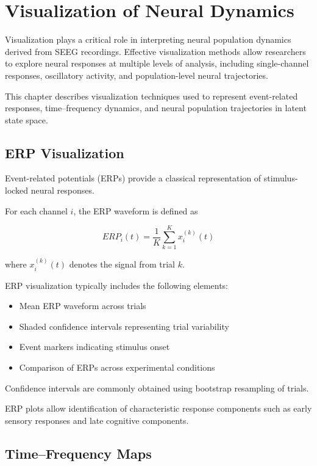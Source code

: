 \documentclass[11pt]{report}
\begin{document}
\chapter{Visualization of Neural Dynamics}

Visualization plays a critical role in interpreting neural population
dynamics derived from SEEG recordings. Effective visualization methods
allow researchers to explore neural responses at multiple levels of
analysis, including single-channel responses, oscillatory activity,
and population-level neural trajectories.

This chapter describes visualization techniques used to represent
event-related responses, time--frequency dynamics, and neural
population trajectories in latent state space.

\section{ERP Visualization}

Event-related potentials (ERPs) provide a classical representation of
stimulus-locked neural responses.

For each channel $i$, the ERP waveform is defined as

\begin{equation}
ERP_i(t) =
\frac{1}{K}
\sum_{k=1}^{K}
x_i^{(k)}(t)
\end{equation}

where $x_i^{(k)}(t)$ denotes the signal from trial $k$.

ERP visualization typically includes the following elements:

\begin{itemize}
\item Mean ERP waveform across trials
\item Shaded confidence intervals representing trial variability
\item Event markers indicating stimulus onset
\item Comparison of ERPs across experimental conditions
\end{itemize}

Confidence intervals are commonly obtained using bootstrap
resampling of trials.

ERP plots allow identification of characteristic response components
such as early sensory responses and late cognitive components.

\section{Time--Frequency Maps}
\end{document}
